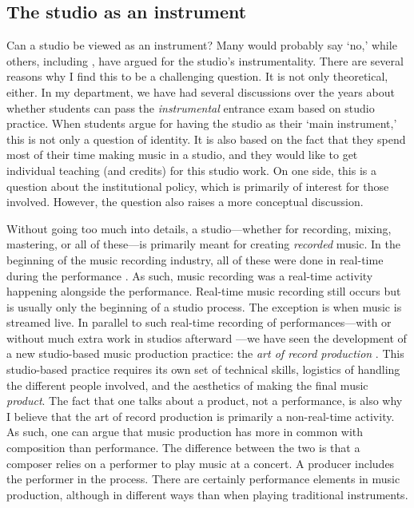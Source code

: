 \subsection{The studio as an instrument}

Can a studio be viewed as an instrument? Many would probably say `no,' while others, including \citet{bell_dawn_2018}, have argued for the studio's instrumentality. There are several reasons why I find this to be a challenging question. It is not only theoretical, either. In my department, we have had several discussions over the years about whether students can pass the \emph{instrumental} entrance exam based on studio practice. When students argue for having the studio as their `main instrument,' this is not only a question of identity. It is also based on the fact that they spend most of their time making music in a studio, and they would like to get individual teaching (and credits) for this studio work. On one side, this is a question about the institutional policy, which is primarily of interest for those involved. However, the question also raises a more conceptual discussion.

Without going too much into details, a studio---whether for recording, mixing, mastering, or all of these---is primarily meant for creating \emph{recorded} music. In the beginning of the music recording industry, all of these were done in real-time during the performance \citep{burgess_history_2014}. As such, music recording was a real-time activity happening alongside the performance. Real-time music recording still occurs but is usually only the beginning of a studio process. The exception is when music is streamed live. In parallel to such real-time recording of performances---with or without much extra work in studios afterward ---we have seen the development of a new studio-based music production practice: the \emph{art of record production} \citep{frith_art_2012}. This studio-based practice requires its own set of technical skills, logistics of handling the different people involved, and the aesthetics of making the final music \emph{product}. The fact that one talks about a product, not a performance, is also why I believe that the art of record production is primarily a non-real-time activity. As such, one can argue that music production has more in common with composition than performance. The difference between the two is that a composer relies on a performer to play music at a concert. A producer includes the performer in the process. There are certainly performance elements in music production, although in different ways than when playing traditional instruments.

